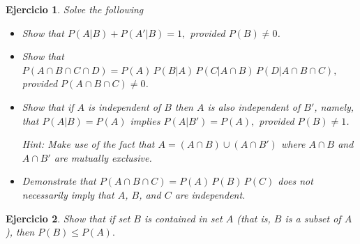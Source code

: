 \documentclass[12pt,twoside]{article}
\newtheorem{Ejer}{Ejercicio}
\begin{document}
\begin{Ejer} Solve the following
\begin{itemize}
\item[a) ] Show that $P(A|B) + P(A'|B) = 1,$ provided $P(B) \neq 0$.

\item[b) ] Show that $P(A \cap B \cap C \cap D)= P(A)\,P(B|A)\,P(C|A \cap B)\,P(D|A \cap B \cap C),$ provided $P(A \cap B \cap C) \neq 0$.

\item[c) ] Show that if $A$ is independent of $B$ then $A$ is also independent of $B'$, namely, that $P(A|B)=P(A)$ implies $P(A|B')=P(A),$ provided $P(B)\neq1$. 

\textit{Hint:} Make use of the fact that
$A=(A\cap B)\cup(A\cap B')$ where $A\cap B$ and $A\cap B'$ are mutually exclusive.

\item[d) ] Demonstrate that $P(A\cap B\cap C)=P(A)\,P(B)\,P(C)$ does not necessarily imply that $A$, $B$, and $C$ are independent.

\end{itemize}
\end{Ejer}

\begin{Ejer} Show that if set $B$ is contained in set $A$ (that is, $B$ is a subset of $A$), then
$P(B)\le P(A).$

\end{Ejer}
\end{document}
